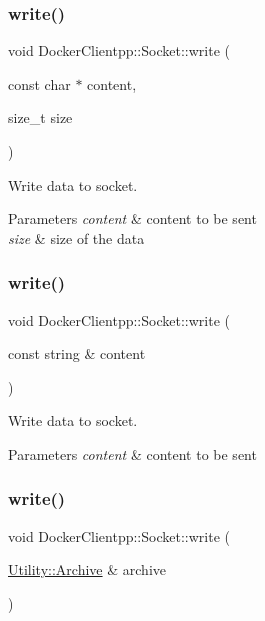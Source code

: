 \subsubsection{\texorpdfstring{write()}{write()}\hspace{0.1cm}{\footnotesize\ttfamily [1/3]}}
{\footnotesize\ttfamily void Docker\+Clientpp\+::\+Socket\+::write (\begin{DoxyParamCaption}\item[{const char $\ast$}]{content,  }\item[{size\+\_\+t}]{size }\end{DoxyParamCaption})}



Write data to socket. 


\begin{DoxyParams}{Parameters}
{\em content} & content to be sent \\
\hline
{\em size} & size of the data \\
\hline
\end{DoxyParams}
\mbox{\label{classDockerClientpp_1_1Socket_aea346fecc5e87835fd9d96615c0c06b6}} 
\subsubsection{\texorpdfstring{write()}{write()}\hspace{0.1cm}{\footnotesize\ttfamily [2/3]}}
{\footnotesize\ttfamily void Docker\+Clientpp\+::\+Socket\+::write (\begin{DoxyParamCaption}\item[{const string \&}]{content }\end{DoxyParamCaption})}



Write data to socket. 


\begin{DoxyParams}{Parameters}
{\em content} & content to be sent \\
\hline
\end{DoxyParams}
\mbox{\label{classDockerClientpp_1_1Socket_a10f23cea48507692b58489a88f30b39f}} 
\subsubsection{\texorpdfstring{write()}{write()}\hspace{0.1cm}{\footnotesize\ttfamily [3/3]}}
{\footnotesize\ttfamily void Docker\+Clientpp\+::\+Socket\+::write (\begin{DoxyParamCaption}\item[{\mbox{\hyperlink{classDockerClientpp_1_1Utility_1_1Archive}{Utility\+::\+Archive}} \&}]{archive }\end{DoxyParamCaption})}




